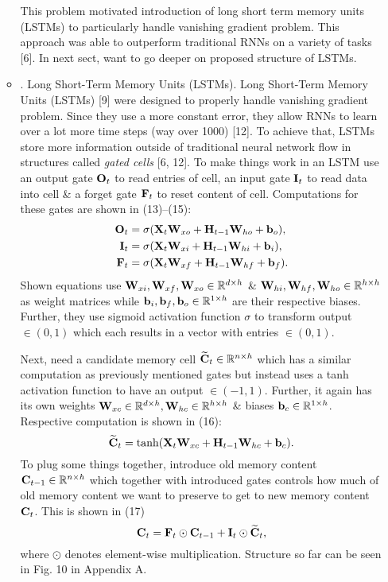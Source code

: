 \documentclass{article}
\begin{document}
\begin{enumerate}
\begin{itemize}
		This problem motivated introduction of long short term memory units (LSTMs) to particularly handle vanishing gradient problem. This approach was able to outperform traditional RNNs on a variety of tasks [6]. In next sect, want to go deeper on proposed structure of LSTMs.
		\item {. Long Short-Term Memory Units (LSTMs).} Long Short-Term Memory Units (LSTMs) [9] were designed to properly handle vanishing gradient problem. Since they use a more constant error, they allow RNNs to learn over a lot more time steps (way over 1000) [12]. To achieve that, LSTMs store more information outside of traditional neural network flow in structures called {\it gated cells} [6, 12]. To make things work in an LSTM use an output gate ${\bf O}_t$ to read entries of cell, an input gate ${\bf I}_t$ to read data into cell \& a forget gate ${\bf F}_t$ to reset content of cell. Computations for these gates are shown in (13)--(15):
		\begin{align}
			{\bf O}_t &= \sigma({\bf X}_t{\bf W}_{xo} + {\bf H}_{t-1}{\bf W}_{ho} + {\bf b}_o),\\
			{\bf I}_t &= \sigma({\bf X}_t{\bf W}_{xi} + {\bf H}_{t-1}{\bf W}_{hi} + {\bf b}_i),\\
			{\bf F}_t &= \sigma({\bf X}_t{\bf W}_{xf} + {\bf H}_{t-1}{\bf W}_{hf} + {\bf b}_f).
		\end{align}
		Shown equations use ${\bf W}_{xi},{\bf W}_{xf},{\bf W}_{xo}\in\mathbb{R}^{d\times h}$ \& ${\bf W}_{hi},{\bf W}_{hf},{\bf W}_{ho}\in\mathbb{R}^{h\times h}$ as weight matrices while ${\bf b}_i,{\bf b}_f,{\bf b}_o\in\mathbb{R}^{1\times h}$ are their respective biases. Further, they use sigmoid activation function $\sigma$ to transform output $\in(0,1)$ which each results in a vector with entries $\in(0,1)$.
		
		Next, need a candidate memory cell $\widetilde{\bf C}_t\in\mathbb{R}^{n\times h}$ which has a similar computation as previously mentioned gates but instead uses a tanh activation function to have an output $\in(-1,1)$. Further, it again has its own weights ${\bf W}_{xc}\in\mathbb{R}^{d\times h},{\bf W}_{hc}\in\mathbb{R}^{h\times h}$ \& biases ${\bf b}_c\in\mathbb{R}^{1\times h}$. Respective computation is shown in (16):
		\begin{equation}
			\widetilde{\bf C}_t = \tanh({\bf X}_t{\bf W}_{xc} + {\bf H}_{t-1}{\bf W}_{hc} + {\bf b}_c).
		\end{equation}
		To plug some things together, introduce old memory content ${\bf C}_{t-1}\in\mathbb{R}^{n\times h}$ which together with introduced gates controls how much of old memory content we want to preserve to get to new memory content ${\bf C}_t$. This is shown in (17)
		\begin{equation}
			{\bf C}_t = {\bf F}_t\odot{\bf C}_{t-1} + {\bf I}_t\odot\widetilde{\bf C}_t,
		\end{equation}
		where $\odot$ denotes element-wise multiplication. Structure so far can be seen in Fig. 10 in Appendix A.
		

\end{itemize}
\end{enumerate}
\end{document}
